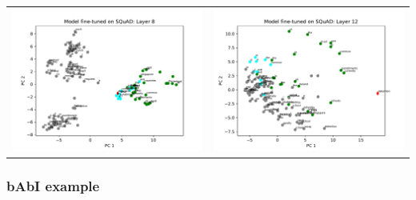 \documentclass{article}
\begin{document}
	\begin{center}
		\begin{tabular}{ c c }
			\includegraphics[scale=0.4]{../badges/reproduced/visualization/squad/model-fine-tuned-on-squad--layer-8.pdf} &
			\includegraphics[scale=0.4]{../badges/reproduced/visualization/squad/model-fine-tuned-on-squad--layer-12.pdf}
		\end{tabular}
	\end{center}

	\subsubsection{bAbI example}
\end{document}
